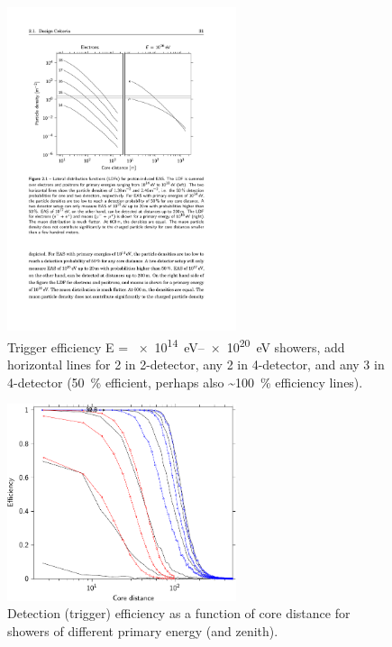 \begin{figure}
    \centering
    \includegraphics[width=0.6\textwidth]
                    {plots/experiment/ldf_energies}
    \caption{Trigger efficiency E = \SIrange{e14}{e20}{\eV} showers, add horizontal lines for 2 in 2-detector, any 2 in 4-detector, and any 3 in 4-detector (\SI{50}{\percent} efficient, perhaps also \SI{~100}{\percent} efficiency lines).}
    \label{fig:ldf_energies2}
\end{figure}


\begin{figure}
    \centering
    \includegraphics[width=0.6\textwidth]
                    {plots/experiment/efficiency_two_16}
    \caption{Detection (trigger) efficiency as a function of core distance for showers of different primary energy (and zenith).}
    \label{fig:efficiency_two_16}
\end{figure}


